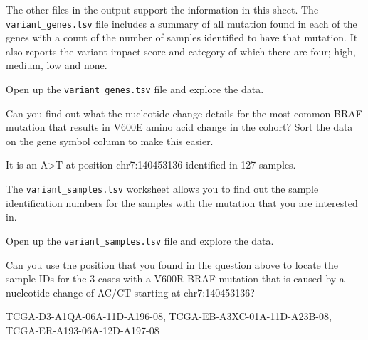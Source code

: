 \begin{information}
The other files in the output support the information in this sheet.
\vspace{4 mm]}
The \texttt{variant\_genes.tsv} file includes a summary of all mutation found in each of the genes with a count
of the number of samples identified to have that mutation. It also reports the variant impact score
and category of which there are four; high, medium, low and none.
\end{information}

\begin{steps}
Open up the \texttt{variant\_genes.tsv} file and explore the data. 
\end{steps}

\begin{questions} 
Can you find out what the nucleotide change details for the most common BRAF mutation that results
in V600E amino acid change in the cohort?
Sort the data on the gene symbol column to make this easier.
\end{questions}

\begin{answer}
It is an A>T at position chr7:140453136 identified in 127 samples.
\end{answer}

\begin{information}
The \texttt{variant\_samples.tsv} worksheet allows you to find out the sample identification numbers
for the samples with the mutation that you are interested in.
\end{information}

\begin{steps}
Open up the \texttt{variant\_samples.tsv} file and explore the data. 
\end{steps}

\begin{questions}
Can you use the position that you found in the question above to locate the sample IDs for the 3
cases with a V600R BRAF mutation that is caused by a nucleotide change of AC/CT starting at chr7:140453136?
\end{questions}

\begin{answer}
TCGA-D3-A1QA-06A-11D-A196-08, TCGA-EB-A3XC-01A-11D-A23B-08, TCGA-ER-A193-06A-12D-A197-08
\end{answer}



